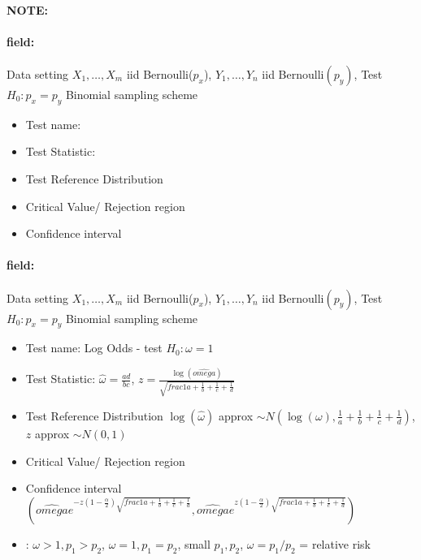 \documentclass[12pt]{article}
\newenvironment{note}{\paragraph{NOTE:}}{}
\newenvironment{field}{\paragraph{field:}}{}
\begin{document}
\begin{note}
  \begin{field}
  Data setting $X_1, \ldots , X_m$ iid Bernoulli($p_x$), $Y_1, \ldots, Y_n$ iid Bernoulli$(p_y)$, Test $H_0: p_x = p_y $ Binomial sampling scheme
  \begin{itemize}
    \item Test name:
    \item Test Statistic:
    \item Test Reference Distribution
    \item Critical Value/ Rejection region
    \item Confidence interval
  \end{itemize}
\end{field}
  \begin{field}
  Data setting $X_1, \ldots , X_m$ iid Bernoulli($p_x$), $Y_1, \ldots, Y_n$ iid Bernoulli$(p_y)$, Test $H_0: p_x = p_y $ Binomial sampling scheme
  \begin{itemize}
    \item Test name: Log Odds - test $H_0: \omega = 1$
    \item Test Statistic: $\hat{\omega} = \frac{ad}{bc}$, $z = \frac{\log(\hat{omega})}{\sqrt{frac{1}{a} + \frac{1}{b} + \frac{1}{c} + \frac{1}{d}}}$
    \item Test Reference Distribution $ \log(\hat{\omega}) $ approx $\sim N(\log(\omega), \frac{1}{a} + \frac{1}{b} + \frac{1}{c} + \frac{1}{d})$, $z $ approx $\sim N(0,1)$
    \item Critical Value/ Rejection region
    \item Confidence interval $(\hat{omega}e^{-z(1 - \frac{\alpha}{2})\sqrt{frac{1}{a} + \frac{1}{b} + \frac{1}{c} + \frac{1}{d}}}, \hat{omega}e^{z(1 - \frac{\alpha}{2})\sqrt{frac{1}{a} + \frac{1}{b} + \frac{1}{c} + \frac{1}{d}}})$
    \item: $\omega > 1, p_1 > p_2$, $\omega = 1, p_1 = p_2$, small $p_1, p_2$, $\omega = p_1/p_2$ = relative risk
  \end{itemize}
\end{field}
\end{note}
\end{document}
